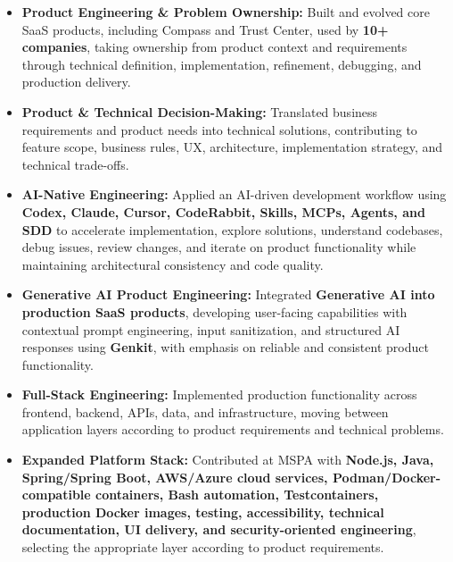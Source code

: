 \documentclass[10pt,a4paper]{article}
\begin{document}
\begin{itemize}

    \item
    \textbf{Product Engineering \& Problem Ownership:}
    Built and evolved core SaaS products, including Compass and
    Trust Center, used by \textbf{10+ companies}, taking ownership
    from product context and requirements through technical
    definition, implementation, refinement, debugging, and
    production delivery.

    \item
    \textbf{Product \& Technical Decision-Making:}
    Translated business requirements and product needs into
    technical solutions, contributing to feature scope, business
    rules, UX, architecture, implementation strategy, and
    technical trade-offs.

    \item
    \textbf{AI-Native Engineering:}
    Applied an AI-driven development workflow using
    \textbf{Codex, Claude, Cursor, CodeRabbit, Skills, MCPs,
    Agents, and SDD} to accelerate implementation, explore
    solutions, understand codebases, debug issues, review changes,
    and iterate on product functionality while maintaining
    architectural consistency and code quality.

    \item
    \textbf{Generative AI Product Engineering:}
    Integrated \textbf{Generative AI into production SaaS products},
    developing user-facing capabilities with contextual prompt
    engineering, input sanitization, and structured AI responses
    using \textbf{Genkit}, with emphasis on reliable and consistent
    product functionality.

    \item
    \textbf{Full-Stack Engineering:}
    Implemented production functionality across frontend,
    backend, APIs, data, and infrastructure, moving between
    application layers according to product requirements and
    technical problems.

    \item
    \textbf{Expanded Platform Stack:}
    Contributed at MSPA with \textbf{Node.js, Java, Spring/Spring Boot,
    AWS/Azure cloud services, Podman/Docker-compatible containers,
    Bash automation, Testcontainers, production Docker images, testing,
    accessibility, technical documentation, UI delivery, and security-oriented engineering},
    selecting the appropriate layer according to product requirements.


\end{itemize}
\end{document}
